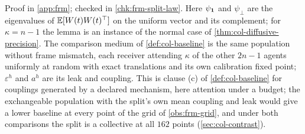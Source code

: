 Proof in \cref{app:frm}; checked in \cref{chk:frm-split-law}. Here $\psi_{\mathbf{1}}$ and $\psi_\perp$ are the eigenvalues of $\mathbb{E}[W(t)W(t)^\top]$ on the uniform vector and its complement; for $\kappa=n-1$ the lemma is an instance of the normal case of \cref{thm:col-diffusive-precision}. The comparison medium of \cref{def:col-baseline} is the same population without frame mismatch, each receiver attending $\kappa$ of the other $2n-1$ agents uniformly at random with exact translations and its own calibration fixed point; $\varepsilon^h$ and $a^h$ are its leak and coupling. This is clause (c) of \cref{def:col-baseline} for couplings generated by a declared mechanism, here attention under a budget; the exchangeable population with the split's own mean coupling and leak would give a lower baseline at every point of the grid of \cref{obs:frm-grid}, and under both comparisons the split is a collective at all $162$ points (\cref{sec:col-contrast}).

